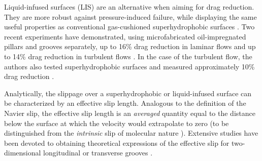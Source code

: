 Liquid-infused surfaces (LIS) are an alternative when aiming for drag reduction. They are more robust against pressure-induced failure, while displaying the same useful properties as conventional gas-cushioned superhydrophobic surfaces \cite{Wexler}. Two recent experiments have demonstrated, using microfabricated oil-impregnated pillars and grooves separately, up to 16\% drag reduction in laminar flows \cite{Solomon} and up to 14\% drag reduction in turbulent flows \cite{Rosenberg}. In the case of the turbulent flow, the authors also tested superhydrophobic surfaces and measured approximately 10\% drag reduction \cite{Rosenberg}.

Analytically, the slippage over a superhydrophobic or liquid-infused surface can be characterized by an effective slip length. Analogous to the definition of the Navier slip, the effective slip length is an \textit{averaged} quantity equal to the distance below the surface at which the velocity would extrapolate to zero (to be distinguished from the \textit{intrinsic} slip of molecular nature \cite{Gentili}). Extensive studies have been devoted to obtaining theoretical expressions of the effective slip for two-dimensional longitudinal or transverse grooves \cite{Lauga_Stone, Sbragalia_Prosperetti, Davis_Lauga, Ng_Wang, Schonecker, Nizkaya, Crowdy_long, Crowdy_tran}.

